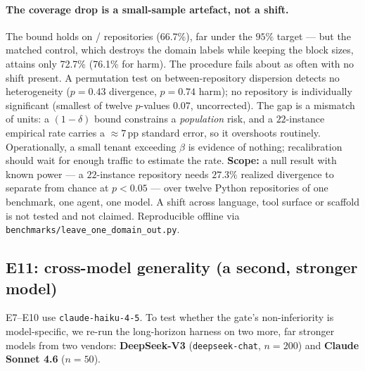 \documentclass{article}
\newcommand{\LooCoverage}{66.7\%} \newcommand{\LooExchCoverage}{72.7\%}
\newcommand{\LooDispP}{0.43}     \newcommand{\LooMinP}{0.07}
\newcommand{\LooHarmExchCoverage}{76.1\%} \newcommand{\LooHarmDispP}{0.74}
\begin{document}
\paragraph{The coverage drop is a small-sample artefact, not a shift.} The bound holds on
\LooHeld{}/\LooDomains{} repositories (\LooCoverage{}), far under the $95\%$ target --- but
the matched control, which destroys the domain labels while keeping the block sizes,
attains only \LooExchCoverage{} (\LooHarmExchCoverage{} for harm). The procedure fails about
as often with no shift present. A permutation test on between-repository dispersion detects
no heterogeneity ($p=\LooDispP$ divergence, $p=\LooHarmDispP$ harm); no repository is
individually significant (smallest of twelve $p$-values \LooMinP{}, uncorrected). The gap is
a mismatch of units: a $(1{-}\delta)$ bound constrains a \emph{population} risk, and a
$22$-instance empirical rate carries a $\approx$$7$\,pp standard error, so it overshoots
routinely. Operationally, a small tenant exceeding $\beta$ is evidence of nothing;
recalibration should wait for enough traffic to estimate the rate. \textbf{Scope:} a null
result with known power --- a $22$-instance repository needs $27.3\%$ realized divergence to
separate from chance at $p<0.05$ --- over twelve Python repositories of one benchmark, one
agent, one model. A shift across language, tool surface or scaffold is not tested and not
claimed. Reproducible offline via \texttt{benchmarks/leave\_one\_domain\_out.py}.

\subsection{E11: cross-model generality (a second, stronger model)}
\label{sec:e11}

E7--E10 use \texttt{claude-haiku-4-5}. To test whether the gate's non-inferiority is
model-specific, we re-run the long-horizon harness on two more, far stronger models from two
vendors: \textbf{DeepSeek-V3} (\texttt{deepseek-chat}, $n{=}200$) and \textbf{Claude Sonnet 4.6}
($n{=}50$).
\end{document}
